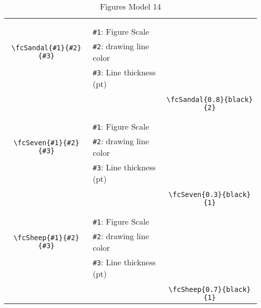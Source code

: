 \documentclass[x11names]{article}
\begin{document}
\begin{table}[H]
\begin{tabular}{|c|l|c|}
	&&\multirow{5}{*}{\fcSandal{0.8}{black}{2}}\\	&&\\	&\verb|#1|: Figure Scale &\\	\verb|\fcSandal{#1}{#2}{#3}|&	\verb|#2|: drawing line color &\\	&\verb|#3|: Line thickness (pt) &\\ &&\\&&	\verb|\fcSandal{0.8}{black}{2}|\\\hline 	
	&&\multirow{5}{*}{\fcSeven{0.3}{black}{1}}\\	&&\\	&\verb|#1|: Figure Scale &\\	\verb|\fcSeven{#1}{#2}{#3}|&	\verb|#2|: drawing line color &\\	&\verb|#3|: Line thickness (pt) &\\ &&\\&&	\verb|\fcSeven{0.3}{black}{1}|\\\hline 	
	&&\multirow{5}{*}{\fcSheep{0.7}{black}{1}}\\	&&\\	&\verb|#1|: Figure Scale &\\	\verb|\fcSheep{#1}{#2}{#3}|&	\verb|#2|: drawing line color &\\	&\verb|#3|: Line thickness (pt) &\\ &&\\&&	\verb|\fcSheep{0.7}{black}{1}|\\\hline 	\hline\end{tabular}\caption{Figures Model 14}\label{tab14}\end{table}
\end{document}
